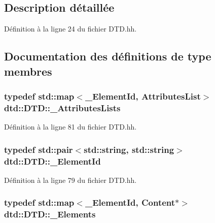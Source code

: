 \subsection{Description détaillée}


Définition à la ligne 24 du fichier DTD.hh.



\subsection{Documentation des définitions de type membres}
\hypertarget{classdtd_1_1_d_t_d_ad0c96201d399a44b597764334d343752}{
\subsubsection[{\_\-AttributesLists}]{\setlength{\rightskip}{0pt plus 5cm}typedef std::map$<${\bf \_\-ElementId}, {\bf AttributesList}$>$ {\bf dtd::DTD::\_\-AttributesLists}}}
\label{classdtd_1_1_d_t_d_ad0c96201d399a44b597764334d343752}


Définition à la ligne 81 du fichier DTD.hh.

\hypertarget{classdtd_1_1_d_t_d_aebfee050799e642c65f08ff77cadfb4e}{
\subsubsection[{\_\-ElementId}]{\setlength{\rightskip}{0pt plus 5cm}typedef std::pair$<$std::string, std::string$>$ {\bf dtd::DTD::\_\-ElementId}}}
\label{classdtd_1_1_d_t_d_aebfee050799e642c65f08ff77cadfb4e}


Définition à la ligne 79 du fichier DTD.hh.

\hypertarget{classdtd_1_1_d_t_d_a3acb9bcea95d9ad98d14b7851b6151c1}{
\subsubsection[{\_\-Elements}]{\setlength{\rightskip}{0pt plus 5cm}typedef std::map$<${\bf \_\-ElementId}, {\bf Content}$\ast$$>$ {\bf dtd::DTD::\_\-Elements}}}
\label{classdtd_1_1_d_t_d_a3acb9bcea95d9ad98d14b7851b6151c1}



